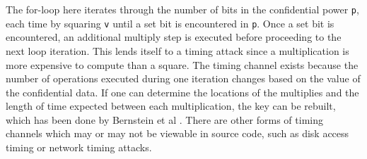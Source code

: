 The for-loop here iterates through the number of bits in the confidential power
\texttt{p}, each time by squaring \texttt{v} until a set bit is encountered
in \texttt{p}. Once a set bit is encountered, an additional multiply step is
executed before proceeding to the next loop iteration. This lends itself to a
timing attack since a multiplication is more expensive to compute than a square. The
timing channel exists because the number of operations executed during one
iteration changes based on the value of the confidential data. If
one can determine the locations of the multiplies and the length of time
expected between each multiplication, the key can be rebuilt, which has been done
by Bernstein et al \cite{bernstein2017sliding}. There are other forms of timing
channels which may or may not be viewable in source code, such as disk access
timing or network timing attacks.
